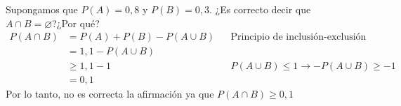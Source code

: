 \item Supongamos que $P(A)=0,8$ y $P(B)=0,3$. ¿Es correcto decir que $A\cap B=\varnothing$?¿Por qué?
    \begin{align*}
        P(A\cap B)&=P(A)+P(B)-P(A\cup B)&&\text{Principio de inclusión-exclusión}\\
        &=1,1-P(A\cup B)\\
        &\geq 1,1-1&&P(A\cup B)\leq1\to -P(A\cup B)\geq -1\\
        &=0,1
    \end{align*}
    Por lo tanto, no es correcta la afirmación ya que $P(A\cap B)\geq 0,1$